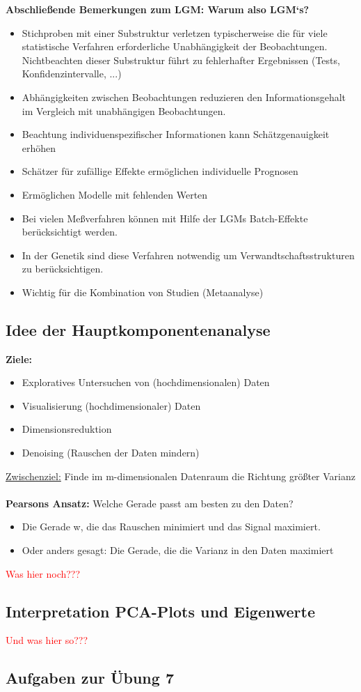 \newpage
\textbf{Abschließende Bemerkungen zum LGM: Warum also LGM‘s?}
\begin{itemize}
	\item Stichproben mit einer Substruktur verletzen typischerweise die für viele statistische Verfahren erforderliche Unabhängigkeit der Beobachtungen. Nichtbeachten dieser Substruktur führt zu fehlerhafter Ergebnissen (Tests, Konfidenzintervalle, ...)
	\item Abhängigkeiten zwischen Beobachtungen reduzieren den Informationsgehalt im Vergleich mit unabhängigen Beobachtungen.
	\item Beachtung individuenspezifischer Informationen kann Schätzgenauigkeit erhöhen
	\item Schätzer für zufällige Effekte ermöglichen individuelle Prognosen
	\item Ermöglichen Modelle mit fehlenden Werten
	\item Bei vielen Meßverfahren können mit Hilfe der LGMs Batch-Effekte berücksichtigt werden.
	\item In der Genetik sind diese Verfahren notwendig um Verwandtschaftsstrukturen zu berücksichtigen.
	\item Wichtig für die Kombination von Studien (Metaanalyse)
\end{itemize}

\newpage
\subsection{Idee der Hauptkomponentenanalyse}
\textbf{Ziele:}
\begin{itemize}
	\item Exploratives Untersuchen von (hochdimensionalen) Daten
	\item Visualisierung (hochdimensionaler) Daten
	\item Dimensionsreduktion
	\item Denoising (Rauschen der Daten mindern)
\end{itemize}
 
\underline{Zwischenziel:} Finde im m-dimensionalen Datenraum die Richtung größter Varianz
\\\\
\textbf{Pearsons Ansatz:} Welche Gerade passt am besten zu den Daten?
\begin{itemize}
	\item Die Gerade w, die das Rauschen minimiert und das Signal maximiert.
	\item Oder anders gesagt: Die Gerade, die die Varianz in den Daten maximiert
\end{itemize}

\textcolor{red}{Was hier noch???}

\subsection{Interpretation PCA-Plots und Eigenwerte}
\textcolor{red}{Und was hier so???}

\subsection{Aufgaben zur Übung 7}
